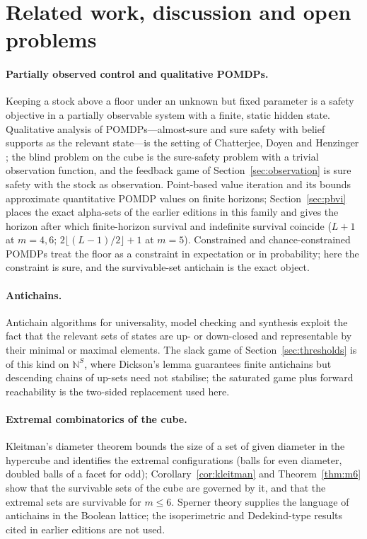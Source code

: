 \documentclass[11pt,a4paper]{article}
\theoremstyle{plain}
\theoremstyle{definition}
\theoremstyle{remark}
\newcommand{\N}{\mathbb{N}}
\begin{document}
\section{Related work, discussion and open problems}\label{sec:related}

\paragraph{Partially observed control and qualitative POMDPs.}
Keeping a stock above a floor under an unknown but fixed parameter is a safety objective in a partially observable system with a finite, static hidden state. Qualitative analysis of POMDPs---almost-sure and sure safety with belief supports as the relevant state---is the setting of Chatterjee, Doyen and Henzinger \cite{CDH2010}; the blind problem on the cube is the sure-safety problem with a trivial observation function, and the feedback game of Section~\ref{sec:observation} is sure safety with the stock as observation. Point-based value iteration \cite{Pineau2003,Shani2013} and its bounds \cite{Lovejoy1991} approximate quantitative POMDP values on finite horizons; Section~\ref{sec:pbvi} places the exact alpha-sets of the earlier editions in this family and gives the horizon after which finite-horizon survival and indefinite survival coincide ($L+1$ at $m=4,6$; $2\lfloor(L-1)/2\rfloor+1$ at $m=5$). Constrained and chance-constrained POMDPs \cite{Altman1999,Poupart2015,Santana2016,Undurti2010,Ono2015} treat the floor as a constraint in expectation or in probability; here the constraint is sure, and the survivable-set antichain is the exact object.

\paragraph{Antichains.}
Antichain algorithms for universality, model checking and synthesis \cite{DeWulf2006,DeWulf2008,DoyenRaskin2009,Filiot2009,Filiot2011} exploit the fact that the relevant sets of states are up- or down-closed and representable by their minimal or maximal elements. The slack game of Section~\ref{sec:thresholds} is of this kind on $\N^S$, where Dickson's lemma \cite{Dickson1913} guarantees finite antichains but descending chains of up-sets need not stabilise; the saturated game plus forward reachability is the two-sided replacement used here.

\paragraph{Extremal combinatorics of the cube.}
Kleitman's diameter theorem \cite{Kleitman1966} bounds the size of a set of given diameter in the hypercube and identifies the extremal configurations (balls for even diameter, doubled balls of a facet for odd); Corollary~\ref{cor:kleitman} and Theorem~\ref{thm:m6} show that the survivable sets of the cube are governed by it, and that the extremal sets are survivable for $m\le6$. Sperner theory \cite{Sperner1927,Engel1997} supplies the language of antichains in the Boolean lattice; the isoperimetric and Dedekind-type results cited in earlier editions are not used.
\end{document}
